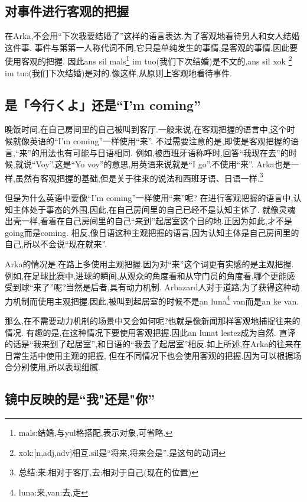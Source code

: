 \subsection{对事件进行客观的把握}

在Arka,不会用``下次我要结婚了''这样的语言表达.为了客观地看待男人和女人结婚这件事.
事件与第第一人称代词不同,它只是单纯发生的事情,是客观的事情.因此要使用客观的把握.
因此ans sil mals\footnote{mals:结婚,与yul格搭配,表示对象,可省略.} im tuo(我们下次结婚)是不文的,ans sil xok
\footnote{xok:[n,adj,adv]相互.sil是``将来,将来会是'',是这句的动词} im tuo(我们下次结婚)是对的.像这样,从原则上客观地看待事件.
\subsection{是「今行くよ」还是``I'm coming''}
晚饭时间,在自己房间里的自己被叫到客厅.一般来说,在客观把握的语言中,这个时候就像英语的``I'm coming''一样使用``来''.
不过需要注意的是,即使是客观把握的语言,``来''的用法也有可能与日语相同.
例如,被西班牙语称呼时,回答``我现在去''的时候,就说``Voy''.这是``Yo voy''的意思,用英语来说就是``I go''.不使用``来''.
Arka也是一样,虽然有客观把握的基础,但是关于往来的说法和西班牙语、日语一样.\footnote{总结:\quad 来:相对于客厅,去:相对于自己(现在的位置)}

但是为什么英语中要像``I'm coming''一样使用``来''呢?
在进行客观把握的语言中,认知主体处于事态的外围,因此,在自己房间里的自己已经不是认知主体了.
就像灵魂出壳一样,看着在自己房间里的自己``来到''起居室这个目的地.正因为如此,才不是going而是coming.
相反,像日语这种主观把握的语言,因为认知主体是自己房间里的自己,所以不会说``现在就来''.

Arka的情况是,在路上多使用主观把握.因为对``来''这个词更有实感的是主观把握.
例如,在足球比赛中,进球的瞬间,从观众的角度看和从守门员的角度看,哪个更能感受到球``来了''呢?当然是后者,具有动力机制.
Arbazard人对于道路,为了获得这种动力机制而使用主观把握.因此,被叫到起居室的时候不是an luna\footnote{luna:来,van:去,走} van而是an ke van.

那么,在不需要动力机制的场景中又会如何呢?也就是像新闻那样客观地捕捉往来的情况.
有趣的是,在这种情况下要使用客观把握.因此an lunat lestez成为自然.
直译的话是``我来到了起居室'',和日语的``我去了起居室''相反.如上所述,在Arka的往来在日常生活中使用主观的把握,
但在不同情况下也会使用客观的把握.因为可以根据场合分别使用,所以表现细腻.

\subsection{镜中反映的是``我"还是"你''}

